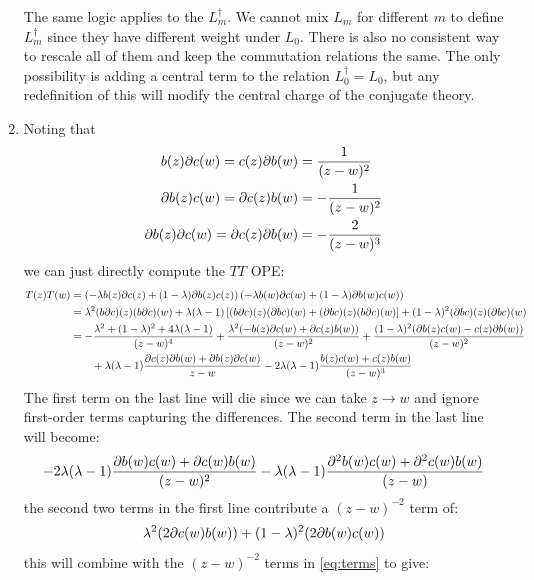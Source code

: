 \documentclass[11pt]{article}
\begin{document}
\begin{enumerate}
	 The same logic applies to the $L_m^\dagger$. We cannot mix $L_m$ for different $m$ to define $L_m^\dagger$ since they have different weight under $L_0$. There is also no consistent way to rescale all of them and keep the commutation relations the same. The only possibility is adding a central term to the relation $L_0^\dagger = L_0$, but any redefinition of this will modify the central charge of the conjugate theory. 
	
	
	
	\item Noting that
	\[
	\begin{aligned}
		b(z) \partial c(w) = c(z) \partial b(w) &= \frac{1}{(z-w)^2}\\
		\partial b(z) c(w) = \partial c(z) b(w) &= - \frac{1}{(z-w)^2}\\ 
		\partial b(z) \partial c(w) = \partial c(z) \partial b(w) &= -\frac{2}{(z-w)^3}
	\end{aligned}
	\]
	we can just directly compute the $TT$ OPE:
	\[
	\begin{aligned}
		T(z) T(w) &= \left(-\lambda b(z) \partial c(z) + (1-\lambda) \partial b(z) c(z) \right) \left(-\lambda b(w) \partial c(w) + (1-\lambda) \partial b(w) c(w) \right)\\
		&= \lambda^2 (b \partial c)(z) (b \partial c)(w) + \lambda (\lambda - 1)\left[ (b \partial c)(z) (\partial b c)(w) + (\partial b c) (z) (b \partial c)(w)\right] + (1-\lambda)^2 (\partial b c)(z) (\partial b c)(w)\\
		&= - \frac{\lambda^2 + (1-\lambda)^2 + 4 \lambda (\lambda-1) }{(z-w)^4} + \frac{\lambda^2 (-b(z) \partial c(w) + \partial c(z) b(w))}{(z-w)^2} + \frac{(1-\lambda)^2 (\partial b(z) c(w) - c(z) \partial b(w))}{(z-w)^2}\\
		&\qquad + \lambda (\lambda-1) \frac{\partial c(z) \partial b(w) + \partial b(z) \partial c(w)}{z-w} - 2 \lambda (\lambda-1) \frac{b(z) c(w) + c(z) b(w)}{(z-w)^3}
	\end{aligned}
	\]
	The first term on the last line will die since we can take $z \to w$ and ignore first-order terms capturing the differences. The second term in the last line will become:
	\begin{equation}\label{eq:terms}
		- 2 \lambda (\lambda - 1) \frac{\partial b(w) c(w) + \partial c(w) b(w)}{(z-w)^2} - \lambda (\lambda - 1) \frac{\partial^2 b(w) c(w) + \partial^2 c(w) b(w)}{(z-w)}
	\end{equation}
	the second two terms in the first line contribute a $(z-w)^{-2}$ term of:
	\[
		\lambda^2 (2 \partial c(w) b(w)) + (1-\lambda)^2 (2 \partial b(w) c(w))
	\]
	this will combine with the $(z-w)^{-2}$ terms in \eqref{eq:terms} to give:

\end{enumerate}
\end{document}
